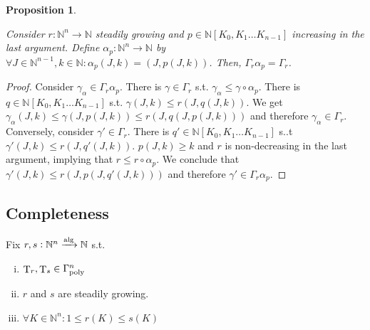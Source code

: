 \documentclass{article}
\numberwithin{equation}{section}
\theoremstyle{definition}
\theoremstyle{plain}
\newtheorem{proposition}{Proposition}[section]
\DeclareMathOperator{\T}{T}
\newcommand{\Nats}{\mathbb{N}}
\newcommand{\NatPoly}{\Nats[K_0, K_1 \ldots K_{n-1}]}
\newcommand{\NatFun}{\Nats^n \rightarrow}
\newcommand{\Fall}{\mathcal{F}}
\newcommand{\GammaPoly}{\Gamma_{\textnormal{poly}}}
\newcommand{\Alg}{\xrightarrow{\textnormal{alg}}}
\begin{document}
\begin{samepage}
\begin{proposition}
\label{prp:gamma_r_alpha_p}

Consider ${r: \NatFun \Nats}$ steadily growing and ${p \in \NatPoly}$ increasing in the last argument. Define ${\alpha_p: \NatFun \Nats}$ by ${\forall J \in \Nats^{n-1}, k \in \Nats: \alpha_p(J,k)=(J,p(J,k))}$. Then, ${\Gamma_r \alpha_p = \Gamma_r}$.

\end{proposition}
\end{samepage}

\begin{proof}

Consider ${\gamma_\alpha \in \Gamma_r \alpha_p}$. There is ${\gamma \in \Gamma_r}$ s.t. ${\gamma_\alpha \leq \gamma \circ \alpha_p}$. There is ${q \in \NatPoly}$ s.t. ${\gamma(J,k) \leq r(J,q(J,k))}$. We get ${\gamma_\alpha(J,k) \leq \gamma(J,p(J,k)) \leq r(J,q(J,p(J,k)))}$ and therefore ${\gamma_\alpha \in \Gamma_r}$. Conversely, consider ${\gamma' \in \Gamma_r}$. There is ${q' \in \NatPoly}$ s..t ${\gamma'(J,k) \leq r(J,q'(J,k))}$. ${p(J,k) \geq k}$ and ${r}$ is non-decreasing in the last argument, implying that ${r \leq r \circ \alpha_p}$. We conclude that\\ ${\gamma'(J,k) \leq r(J,p(J,q'(J,k)))}$ and therefore ${\gamma' \in \Gamma_r \alpha_p}$.
%
\end{proof}

\subsection{Completeness}


Fix ${r,s: \Nats^n \Alg \Nats}$ s.t.

\begin{enumerate}[(i)]

\item ${\T_r, \T_s \in \GammaPoly^n}$

\item ${r}$ and ${s}$ are steadily growing.

\item ${\forall K \in \Nats^n: 1 \leq r(K) \leq s(K)}$

\end{enumerate}
\end{document}
